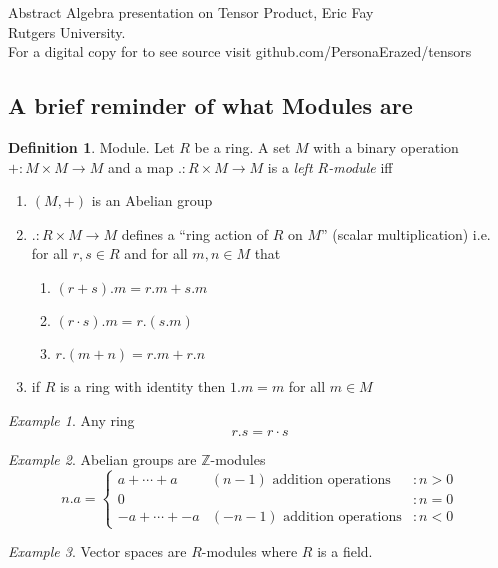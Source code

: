 \documentclass{article}
\theoremstyle{plain}
\theoremstyle{definition}
\newtheorem{defn}{Definition}[section]
\theoremstyle{remark}
\newtheorem{eg}{Example}[section]
\begin{document}
  Abstract Algebra presentation on Tensor Product, Eric Fay\\ Rutgers University. \\[1em]
  For a digital copy for to see source visit
  github.com/PersonaErazed/tensors
  \subsection{A brief reminder of what Modules are}
  \begin{defn}
    Module.
    Let $R$ be a ring. A set $M$ with a binary operation 
    $+:M\times M\to M$ and a map $.:R\times M\to M$ is a 
    \emph{left $R$-module} iff
    \begin{enumerate}
      \item $(M,+)$ is an Abelian group
      \item $.:R\times M\to M$ defines a ``ring action of $R$ on $M$''
        (scalar multiplication) i.e.
        for all $r,s\in R$ and for all $m,n\in M$ that
        \begin{enumerate}
          \item $(r+s).m=r.m+s.m$
          \item $(r\cdot s).m=r.(s.m)$
          \item $r.(m+n)=r.m+r.n$
        \end{enumerate}
      \item if $R$ is a ring with identity then $1.m=m$ for all $m\in M$
    \end{enumerate}
  \end{defn}
  \begin{eg}
    Any ring \[r.s = r\cdot s\]
  \end{eg}
  \begin{eg}
    Abelian groups are $\mathbb{Z}$-modules
    \[n.a=\left\{\begin{array}{llr} 
        a+\cdots+a &(n-1) \text{ addition operations}& :n>0 \\
        0 && :n=0 \\
        -a+\cdots+ -a &(-n-1) \text{ addition operations} &:n<0
      \end{array}\right.\]
  \end{eg}
  \begin{eg}
    Vector spaces are $R$-modules where $R$ is a field.
  \end{eg}
\end{document}

